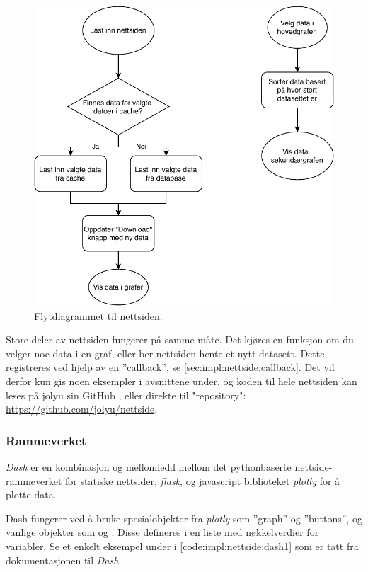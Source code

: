 \begin{figure}[!htbp]
    \centering
    \includegraphics[width=.7\textwidth]{implementering/nettside/JolyuNettsideOverordnetFlyt.pdf}
    \caption{Flytdiagrammet til nettsiden.}
    \label{fig:nettside:flytdiagram}
\end{figure}

Store deler av nettsiden fungerer på samme måte. 
Det kjøres en funksjon om du velger noe data i en graf, eller ber nettsiden hente et nytt datasett. 
Dette registreres ved hjelp av en ''callback'', se \autoref{sec:impl:nettside:callback}.
Det vil derfor kun gis noen eksempler i avsnittene under, og koden til hele nettsiden kan leses på jolyu sin GitHub \cite{GitHub}, eller direkte til "repository": \url{https://github.com/jolyu/nettside}.

\subsubsection{Rammeverket}\label{sec:impl:nettside:rammeverk}

\textit{Dash} \cite{dash} er en kombinasjon og mellomledd mellom det pythonbaserte nettside-rammeverket for statiske nettsider, \textit{flask}, \cite{flask} og javascript biblioteket \textit{plotly} \cite{plotly} for å plotte data.

Dash fungerer ved å bruke spesialobjekter fra \textit{plotly} som ''graph'' og ''buttons'', og vanlige  objekter som  og . 
Disse defineres i en liste med nøkkelverdier for variabler. Se et enkelt eksempel under i \autoref{code:impl:nettside:dash1} som er tatt fra dokumentasjonen til \textit{Dash}. 

